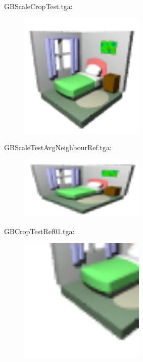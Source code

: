 GBScaleCropTest.tga:\\
\begin{center}
\begin{figure}[H]
\centering\includegraphics[width=6cm]{./GBScaleCropTest.png}\\
\end{figure}
\end{center}

GBScaleTestAvgNeighbourRef.tga:\\
\begin{center}
\begin{figure}[H]
\centering\includegraphics[width=6cm]{./GBScaleTestAvgNeighbourRef01.png}\\
\end{figure}
\end{center}

GBCropTestRef01.tga:\\
\begin{center}
\begin{figure}[H]
\centering\includegraphics[width=6cm]{./GBCropTestRef01.png}\\
\end{figure}
\end{center}

